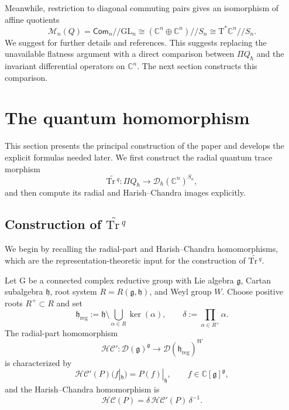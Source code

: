 \documentclass[11pt,reqno]{amsart}
\theoremstyle{definition}
\newcommand{\bbC}{\mathbb{C}}
\newcommand{\GL}{\mathrm{GL}}
\newcommand{\rmG}{\mathrm{G}}
\newcommand{\Tr}{\mathrm{Tr} \,}
\newcommand{\mD}{\mathcal{D}}
\newcommand{\fkg}{\mathfrak{g}}
\newcommand{\Com}{\mathsf{Com}}
\newcommand{\fkh}{\mathfrak{h}}
\newcommand{\hc}{\mathcal{HC}}
\newcommand{\reg}{\mathrm{reg}}
\newcommand{\rmT}{\mathrm{T}}
\newcommand{\mM}{\mathcal{M}}
\begin{document}
Meanwhile,
restriction to diagonal
commuting pairs gives an isomorphism of affine quotients
\[
\mM_n (Q) = \Com_n//\GL_n
\cong
(\bbC^n\oplus\bbC^n)//S_n
\cong
\rmT^*\bbC^n//S_n.
\]
We suggest \cite{GanGin2006,Eti2009Lec} for further details and references.
This suggests replacing the unavailable flatness argument with a direct comparison between \(\Pi Q_{\hbar}\) and the invariant differential operators on \(\bbC^n\).
The next section constructs this comparison.







\section{The quantum homomorphism}\label{sec: quant mor}

This section presents the principal construction of the paper and develops the explicit formulas needed later.  
We first construct the radial quantum trace morphism
\[
\widetilde{\Tr^q}:
\Pi Q_{\hbar}
\longrightarrow
\mD_\hbar(\bbC^n)^{S_n},
\]
and then compute its radial and Harish--Chandra images explicitly.

\subsection{Construction of \texorpdfstring{\({\widetilde{\Tr^q}}\)}{the radial quantum trace}}\label{subsec: tilde Tr}

We begin by recalling the radial-part and Harish--Chandra homomorphisms, which are the representation-theoretic input for the construction of \(\widetilde{\Tr^q}\).


Let \(\rmG\) be a connected complex reductive group with Lie algebra
\(\fkg\), Cartan subalgebra \(\fkh\), root system
\(R=R(\fkg,\fkh)\), and Weyl group \(W\).
Choose positive roots
\(R^+\subset R\) and set
\[
\fkh_{\reg}
:=
\fkh\setminus\bigcup_{\alpha\in R}\ker(\alpha),
\qquad
\delta:=\prod_{\alpha\in R^+}\alpha.
\]
The radial-part homomorphism
\[
\hc':\mD(\fkg)^{\fkg}\longrightarrow\mD(\fkh_{\reg})^W
\]
is characterized by
\[
\hc'(P)(f|_{\fkh})=P(f)|_{\fkh},
\qquad f\in\bbC[\fkg]^{\fkg},
\]
and the Harish--Chandra homomorphism is
\[
\hc(P)=\delta\,\hc'(P)\,\delta^{-1}.
\]
\end{document}
